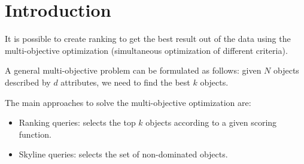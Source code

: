 \section{Introduction}

It is possible to create ranking to get the best result out of the data using the multi-objective optimization (simultaneous optimization of different criteria). 

A general multi-objective problem can be formulated as follows: given $N$ objects described by $d$ attributes, we need to find the best $k$ objects. 

The main approaches to solve the multi-objective optimization are: 
\begin{itemize}
    \item Ranking queries: selects the top $k$ objects according to a given scoring function.
    \item Skyline queries: selects the set of non-dominated objects. 
\end{itemize}